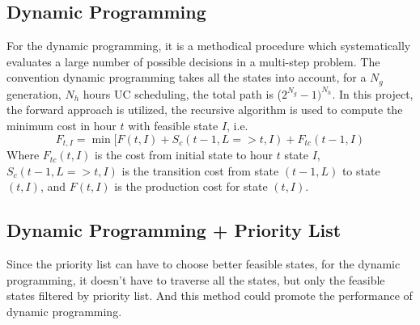 \documentclass[a4paper, 12pt, notitlepage]{report}
\begin{document}
\subsection{Dynamic Programming}
For the dynamic programming, it is a methodical procedure which systematically evaluates a large number of possible decisions in a multi-step problem. The convention dynamic programming takes all the states into account, for a $N_g$ generation, $N_h$ hours UC scheduling, the total path is ($2^{N_{g}}-1)^{N_{h}}$. In this project, the forward approach is utilized, the recursive algorithm is used to compute the minimum cost in hour $t$ with feasible state $I$, i.e.
\begin{equation}
F_{t,I}=\min[F(t,I)+S_{c}(t-1,L=>t,I)+F_{tc}(t-1,I)
\end{equation}
Where $F_{tc}(t,I)$ is the cost from initial state to hour $t$ state $I$, $S_{c}(t-1,L=>t,I)$ is the transition cost from state $(t-1,L)$ to state $(t,I)$, and $F(t,I)$ is the production cost for state $(t,I)$.
\subsection{Dynamic Programming + Priority List}
Since the priority list can have to choose better feasible states, for the dynamic programming, it doesn't have to traverse all the states, but only the feasible states filtered by priority list. And this method could promote the performance of dynamic programming.\cite{5}
\end{document}
